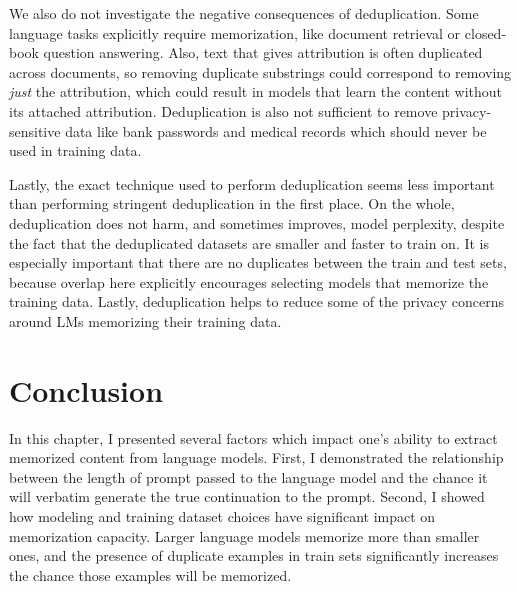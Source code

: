 We also do not investigate the negative consequences of deduplication.
Some language tasks explicitly require memorization, like document retrieval or closed-book question answering. 
Also, text that gives attribution is often duplicated across documents, so
removing duplicate substrings could correspond to removing \emph{just} the attribution, which could result in models that learn the content without its attached attribution.
Deduplication is also not sufficient to remove privacy-sensitive data like bank passwords and medical records which should never be used in training data.

Lastly, the exact technique used to perform deduplication seems less important than performing stringent deduplication in the first place.
On the whole, deduplication does not harm, and sometimes improves, model perplexity, despite the fact that the deduplicated datasets are smaller and faster to train on.
It is especially important that there are no duplicates between the train and test sets, because overlap here explicitly encourages selecting models that memorize the training data.
Lastly, deduplication helps to reduce some of the privacy concerns around LMs memorizing their training data.


\section{Conclusion}

%
In this chapter, I presented several factors which impact one's ability to extract memorized content from language models.
First, I demonstrated the relationship between the length of prompt passed to the language model and the chance it will verbatim generate the true continuation to the prompt.
Second, I showed how modeling and training dataset choices have significant impact on memorization capacity.
Larger language models memorize more than smaller ones, and the presence of duplicate examples in train sets significantly increases the chance those examples will be memorized.

